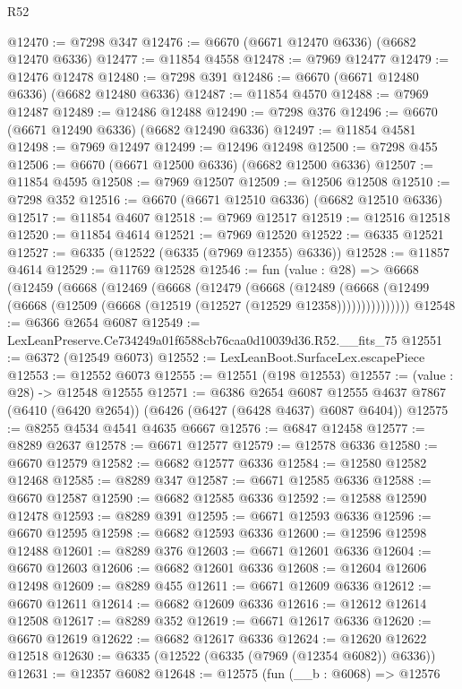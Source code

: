 \begin{lexlean}{R52}
\begin{coremodule}
@12470 := @7298 @347
@12476 := @6670 (@6671 @12470 @6336) (@6682 @12470 @6336)
@12477 := @11854 @4558
@12478 := @7969 @12477
@12479 := @12476 @12478
@12480 := @7298 @391
@12486 := @6670 (@6671 @12480 @6336) (@6682 @12480 @6336)
@12487 := @11854 @4570
@12488 := @7969 @12487
@12489 := @12486 @12488
@12490 := @7298 @376
@12496 := @6670 (@6671 @12490 @6336) (@6682 @12490 @6336)
@12497 := @11854 @4581
@12498 := @7969 @12497
@12499 := @12496 @12498
@12500 := @7298 @455
@12506 := @6670 (@6671 @12500 @6336) (@6682 @12500 @6336)
@12507 := @11854 @4595
@12508 := @7969 @12507
@12509 := @12506 @12508
@12510 := @7298 @352
@12516 := @6670 (@6671 @12510 @6336) (@6682 @12510 @6336)
@12517 := @11854 @4607
@12518 := @7969 @12517
@12519 := @12516 @12518
@12520 := @11854 @4614
@12521 := @7969 @12520
@12522 := @6335 @12521
@12527 := @6335 (@12522 (@6335 (@7969 @12355) @6336))
@12528 := @11857 @4614
@12529 := @11769 @12528
@12546 := fun (value : @28) =>
  @6668
    (@12459
      (@6668
        (@12469
          (@6668
            (@12479
              (@6668
                (@12489
                  (@6668 (@12499 (@6668 (@12509 (@6668 (@12519 (@12527 (@12529 @12358)))))))))))))))
@12548 := @6366 @2654 @6087
@12549 := LexLeanPreserve.Ce734249a01f6588cb76caa0d10039d36.R52.__fits_75
@12551 := @6372 (@12549 @6073)
@12552 := LexLeanBoot.SurfaceLex.escapePiece
@12553 := @12552 @6073
@12555 := @12551 (@198 @12553)
@12557 := (value : @28) -> @12548 @12555
@12571 := @6386
    @2654
    @6087
    @12555
    @4637
    @7867
    (@6410 (@6420 @2654))
    (@6426 (@6427 (@6428 @4637) @6087 @6404))
@12575 := @8255 @4534 @4541 @4635 @6667
@12576 := @6847 @12458
@12577 := @8289 @2637
@12578 := @6671 @12577
@12579 := @12578 @6336
@12580 := @6670 @12579
@12582 := @6682 @12577 @6336
@12584 := @12580 @12582 @12468
@12585 := @8289 @347
@12587 := @6671 @12585 @6336
@12588 := @6670 @12587
@12590 := @6682 @12585 @6336
@12592 := @12588 @12590 @12478
@12593 := @8289 @391
@12595 := @6671 @12593 @6336
@12596 := @6670 @12595
@12598 := @6682 @12593 @6336
@12600 := @12596 @12598 @12488
@12601 := @8289 @376
@12603 := @6671 @12601 @6336
@12604 := @6670 @12603
@12606 := @6682 @12601 @6336
@12608 := @12604 @12606 @12498
@12609 := @8289 @455
@12611 := @6671 @12609 @6336
@12612 := @6670 @12611
@12614 := @6682 @12609 @6336
@12616 := @12612 @12614 @12508
@12617 := @8289 @352
@12619 := @6671 @12617 @6336
@12620 := @6670 @12619
@12622 := @6682 @12617 @6336
@12624 := @12620 @12622 @12518
@12630 := @6335 (@12522 (@6335 (@7969 (@12354 @6082)) @6336))
@12631 := @12357 @6082
@12648 := @12575
    (fun (__b : @6068) =>
    @12576

\end{coremodule}
\end{lexlean}
